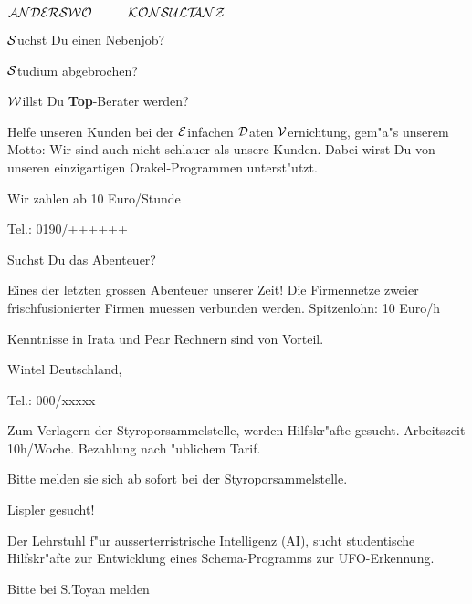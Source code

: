 \documentclass[a4paper, 12pt]{article}
\begin{document}
  { 
  { \Large

  $\cal ANDERSWO \hskip 1cm KONSULT\hskip -0.15cm ANZ$

  } \large \sl
  \bigskip

  $\cal S$uchst Du einen Nebenjob?

  \medskip

  $\cal S$tudium abgebrochen?

  \medskip 

  $\cal W$illst Du {\bf\sf Top}-Berater werden?

  \bigskip

  Helfe unseren Kunden bei der $\cal E$infachen $\cal D$aten $\cal V$ernichtung, gem"a"s
  unserem Motto: Wir sind auch nicht schlauer als unsere Kunden.
  Dabei wirst Du von unseren einzigartigen Orakel-Programmen unterst"utzt.

  \medskip

  Wir zahlen ab 10 Euro/Stunde

  \hfill                             Tel.: 0190/++++++

  }

\vskip 5cm

  { \helv \baselineskip 18pt

  Suchst Du das Abenteuer?

  \medskip

  Eines der letzten grossen Abenteuer unserer Zeit! 
  Die Firmennetze zweier frischfusionierter Firmen muessen
  verbunden werden. Spitzenlohn: 10 Euro/h

  \medskip

  Kenntnisse in Irata und Pear Rechnern sind von Vorteil.

  \medskip

  \hfill                    Wintel Deutschland, 

  \hfill                    Tel.: 000/xxxxx

  }

\vskip 5cm

  Zum Verlagern der Styroporsammelstelle, werden Hilfskr"afte
  gesucht. Arbeitszeit 10h/Woche. Bezahlung nach "ublichem Tarif.

  \medskip

  Bitte melden sie sich ab sofort bei der Styroporsammelstelle.

\vskip 5cm

  {
  { \LARGE \center \bf

  Lispler gesucht!

  } \large

  \bigskip

  Der Lehrstuhl f"ur ausserterristrische Intelligenz (AI), sucht 
  studentische Hilfskr"afte zur Entwicklung eines Schema-Programms
  zur UFO-Erkennung.

  \smallskip

  Bitte bei S.Toyan melden

  }
\end{document}
